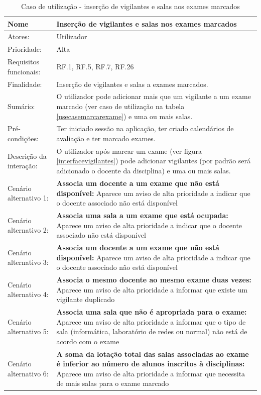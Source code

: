 \documentclass[11pt, twoside]{report}
\begin{document}
	
\def\arraystretch{1.5}
\begin{center}
	\begin{longtable}{|m{4cm}|m{12cm}|}
	\caption{Caso de utilização - inserção de vigilantes e salas nos exames marcados}\\
		
		\hline
	\textbf{Nome }	& \textbf{Inserção de vigilantes e salas nos exames marcados} \\
	\hline
	Atores: & Utilizador\\
	\hline
	Prioridade: &  Alta\\
	\hline
	Requisitos funcionais:& RF.1, RF.5, RF.7, RF.26 \\
	\hline
	Finalidade: & Inserção de vigilantes e salas a exames marcados.\\
	\hline
	Sumário: & O utilizador pode adicionar mais que um vigilante a um exame marcado (ver caso de utilização na tabela \ref{usecasemarcarexame}) e uma ou mais salas.\\
	\hline
	Pré-condições: & Ter iniciado sessão na aplicação, ter criado calendários de avaliação e ter marcado exames.\\
	\hline 
	Descrição da interação: & O utilizador após marcar um exame (ver figura \ref{interfacevigilantes}) pode adicionar vigilantes (por padrão será adicionado o docente da disciplina) e uma ou mais salas. \\
	\hline
	Cenário alternativo 1: & \textbf{Associa um docente a um exame que não está disponível:} Aparece um aviso de alta prioridade a indicar que o docente associado não está disponível\\
	\hline
	Cenário alternativo 2: & \textbf{Associa uma sala a um exame que está ocupada:} Aparece um aviso de alta prioridade a indicar que o docente associado não está disponível\\
	\hline
	Cenário alternativo 3: & \textbf{Associa um docente a um exame que não está disponível:} Aparece um aviso de alta prioridade a indicar que o docente associado não está disponível\\
	\hline
	Cenário alternativo 4: & \textbf{Associa o mesmo docente ao mesmo exame duas vezes:} Aparece um aviso de alta prioridade a informar que existe um vigilante duplicado\\
	\hline
	Cenário alternativo 5: & \textbf{Associa uma sala que não é apropriada para o exame:} Aparece um aviso de alta prioridade a informar que o tipo de sala (informática, laboratório de redes ou normal) não está de acordo com o exame\\
	\hline
	Cenário alternativo 6: & \textbf{A soma da lotação total das salas associadas ao exame é inferior ao número de alunos inscritos à disciplinas:} Aparece um aviso de alta prioridade a informar que necessita de mais salas para o exame marcado\\
	\hline
	\end{longtable}
\end{center}
\end{document}

